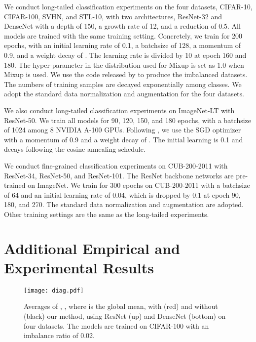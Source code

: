 \documentclass{article}
\newcommand{\<}{\left\langle}
\renewcommand{\>}{\right\rangle}
\begin{document}
\begin{center}
{We conduct long-tailed classification experiments on the four datasets, CIFAR-10, CIFAR-100, SVHN, and STL-10, with two architectures, ResNet-32 and DenseNet with a depth of 150, a growth rate of 12, and a reduction of 0.5. All models are trained with the same training setting. Concretely, we train for 200 epochs, with an initial learning rate of 0.1, a batchsize of 128, a momentum of 0.9, and a weight decay of . The learning rate is divided by 10 at epoch 160 and 180. The hyper-parameter in the  distribution used for Mixup is set as 1.0 when Mixup is used. We use the code released by \cite{zhong2021improving} to produce the imbalanced datasets. The numbers of training samples are decayed exponentially among classes. We adopt the standard data normalization and augmentation for the four datasets. 

We also conduct long-tailed classification experiments on ImageNet-LT with ResNet-50. We train all models for 90, 120, 150, and 180 epochs, with a batchsize of 1024 among 8 NVIDIA A-100 GPUs. Following \cite{zhong2021improving}, we use the SGD optimizer with a momentum of 0.9 and a weight decay of . The initial learning is 0.1 and decays following the cosine annealing schedule. 

We conduct fine-grained classification experiments on CUB-200-2011 with ResNet-34, ResNet-50, and ResNet-101. The ResNet backbone networks are pre-trained on ImageNet. We train for 300 epochs on CUB-200-2011 with a batchsize of 64 and an initial learning rate of 0.04, which is dropped by 0.1 at epoch 90, 180, and 270. The standard data normalization and augmentation are adopted. Other training settings are the same as the long-tailed experiments. 

\section{Additional Empirical and Experimental Results}
\label{exp}


\begin{figure*}[!t]
\begin{center}
\texttt{[image: diag.pdf]}
		\vspace{-6mm}
		\caption{Averages of , , where  is the global mean, with (red) and without (black) our method, using ResNet (up) and DenseNet (bottom) on four datasets. The models are trained on CIFAR-100 with an imbalance ratio of 0.02.}
		\label{diag}
	\end{center}
	\vspace{-1mm}
\end{figure*}

}
\end{center}
\end{document}
